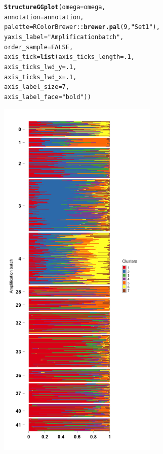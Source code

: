 \documentclass[12pt]{article}\usepackage[]{graphicx}\usepackage[usenames,dvipsnames]{color}
\makeatletter
\newcommand{\hlnum}[1]{\textcolor[rgb]{0.686,0.059,0.569}{#1}}%
\newcommand{\hlstr}[1]{\textcolor[rgb]{0.192,0.494,0.8}{#1}}%
\newcommand{\hlopt}[1]{\textcolor[rgb]{0,0,0}{#1}}%
\newcommand{\hlstd}[1]{\textcolor[rgb]{0.345,0.345,0.345}{#1}}%
\newcommand{\hlkwc}[1]{\textcolor[rgb]{0.333,0.667,0.333}{#1}}%
\newcommand{\hlkwd}[1]{\textcolor[rgb]{0.737,0.353,0.396}{\textbf{#1}}}%
\newenvironment{kframe}{%
 \def\at@end@of@kframe{}%
 \ifinner\ifhmode%
  \def\at@end@of@kframe{\end{minipage}}%
  \begin{minipage}{\columnwidth}%
 \fi\fi%
 \def\FrameCommand##1{\hskip\@totalleftmargin \hskip-\fboxsep
 \colorbox{shadecolor}{##1}\hskip-\fboxsep
     \hskip-\linewidth \hskip-\@totalleftmargin \hskip\columnwidth}%
 \MakeFramed {\advance\hsize-\width
   \@totalleftmargin\z@ \linewidth\hsize
   \@setminipage}}%
 {\par\unskip\endMakeFramed%
 \at@end@of@kframe}
\newenvironment{knitrout}{}{} %
\makeatother
\begin{document}
\begin{figure}[htp]
\begin{center}
\begin{knitrout}
\color{fgcolor}\begin{kframe}
\begin{alltt}
\hlkwd{StructureGGplot}\hlstd{(}\hlkwc{omega} \hlstd{= omega,}
                \hlkwc{annotation} \hlstd{= annotation,}
                \hlkwc{palette} \hlstd{= RColorBrewer}\hlopt{::}\hlkwd{brewer.pal}\hlstd{(}\hlnum{9}\hlstd{,} \hlstr{"Set1"}\hlstd{),}
                \hlkwc{yaxis_label} \hlstd{=} \hlstr{"Amplification batch"}\hlstd{,}
                \hlkwc{order_sample} \hlstd{=} \hlnum{FALSE}\hlstd{,}
                \hlkwc{axis_tick} \hlstd{=} \hlkwd{list}\hlstd{(}\hlkwc{axis_ticks_length} \hlstd{=} \hlnum{.1}\hlstd{,}
                                 \hlkwc{axis_ticks_lwd_y} \hlstd{=} \hlnum{.1}\hlstd{,}
                                 \hlkwc{axis_ticks_lwd_x} \hlstd{=} \hlnum{.1}\hlstd{,}
                                 \hlkwc{axis_label_size} \hlstd{=} \hlnum{7}\hlstd{,}
                                 \hlkwc{axis_label_face} \hlstd{=} \hlstr{"bold"}\hlstd{))}
\end{alltt}
\end{kframe}
\includegraphics[width=3in,height=7in]{figure/plot_topic-1} 

\end{knitrout}
\end{center}
\end{figure}
\end{document}
